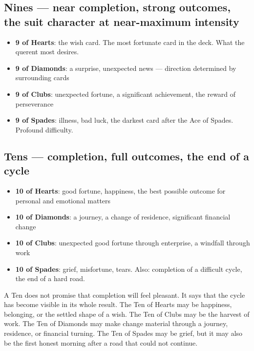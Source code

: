 \subsection{Nines --- near completion, strong outcomes, the suit character at near-maximum intensity}\label{nines--near-completion-strong-outcomes-the-suit-character-at-near-maximum-intensity}

\begin{itemize}
\tightlist
\item
  \textbf{9 of Hearts}: the wish card. The most fortunate card in the deck. What the querent most desires.
\item
  \textbf{9 of Diamonds}: a surprise, unexpected news --- direction determined by surrounding cards
\item
  \textbf{9 of Clubs}: unexpected fortune, a significant achievement, the reward of perseverance
\item
  \textbf{9 of Spades}: illness, bad luck, the darkest card after the Ace of Spades. Profound difficulty.
\end{itemize}

\subsection{Tens --- completion, full outcomes, the end of a cycle}\label{tens--completion-full-outcomes-the-end-of-a-cycle}

\begin{itemize}
\tightlist
\item
  \textbf{10 of Hearts}: good fortune, happiness, the best possible outcome for personal and emotional matters
\item
  \textbf{10 of Diamonds}: a journey, a change of residence, significant financial change
\item
  \textbf{10 of Clubs}: unexpected good fortune through enterprise, a windfall through work
\item
  \textbf{10 of Spades}: grief, misfortune, tears. Also: completion of a difficult cycle, the end of a hard road.
\end{itemize}

A Ten does not promise that completion will feel pleasant. It says that the
cycle has become visible in its whole result. The Ten of Hearts may be
happiness, belonging, or the settled shape of a wish. The Ten of Clubs may be
the harvest of work. The Ten of Diamonds may make change material through a
journey, residence, or financial turning. The Ten of Spades may be grief, but it
may also be the first honest morning after a road that could not continue.

